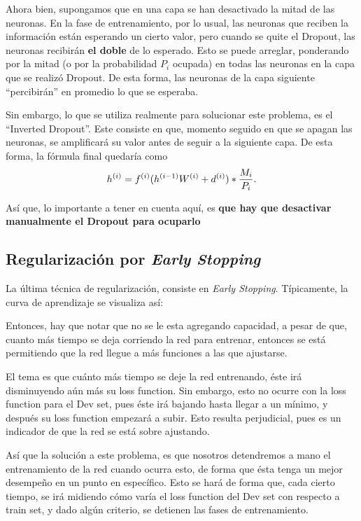 Ahora bien, supongamos que en una capa se han desactivado la mitad de las neuronas. En la fase de entrenamiento, por lo usual, las neuronas que reciben la información están esperando un cierto valor, pero cuando se quite el Dropout, las neuronas recibirán \textbf{el doble} de lo esperado. Esto se puede arreglar, ponderando por la mitad (o por la probabilidad $P_i$ ocupada) en todas las neuronas en la capa que se realizó Dropout. De esta forma, las neuronas de la capa siguiente ``percibirán'' en promedio lo que se esperaba.

Sin embargo, lo que se utiliza realmente para solucionar este problema, es el ``Inverted Dropout''. Este consiste en que, momento seguido en que se apagan las neuronas, se amplificará su valor antes de seguir a la siguiente capa. De esta forma, la fórmula final quedaría como
\begin{equation}
    h\entr = f\entr(h\entr[i-1] W\entr + d\entr) \ast \frac{M_i}{P_i}.
\end{equation}

Así que, lo importante a tener en cuenta aquí, es \textbf{que hay que desactivar manualmente el Dropout para ocuparlo}

\subsection{Regularización por \textit{Early Stopping}}

La última técnica de regularización, consiste en \textit{Early Stopping}. Típicamente, la curva de aprendizaje se visualiza así:

Entonces, hay que notar que no se le esta agregando capacidad, a pesar de que, cuanto más tiempo se deja corriendo la red para entrenar, entonces se está permitiendo que la red llegue a más funciones a las que ajustarse.

El tema es que cuánto más tiempo se deje la red entrenando, éste irá disminuyendo aún más su loss function. Sin embargo, esto no ocurre con la loss function para el Dev set, pues éste irá bajando hasta llegar a un mínimo, y después su loss function empezará a subir. Esto resulta perjudicial, pues es un indicador de que la red se está sobre ajustando.

Así que la solución a este problema, es que nosotros detendremos a mano el entrenamiento de la red cuando ocurra esto, de forma que ésta tenga un mejor desempeño en un punto en específico. Esto se hará de forma que, cada cierto tiempo, se irá midiendo cómo varía el loss function del Dev set con respecto a train set, y dado algún criterio, se detienen las fases de entrenamiento.

